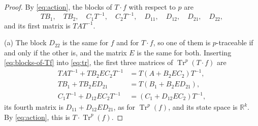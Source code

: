 \documentclass[11pt,a4paper]{article}
\theoremstyle{plain}
\theoremstyle{definition}
\theoremstyle{remark}
\DeclareMathOperator{\Tr}{Tr}
\newcommand{\R}{\mathbb{R}}
\begin{document}
\begin{proof}
    By \cref{eq:action}, the blocks of $T \cdot f$ with respect to $p$ are
    \begin{equation}
        \label{eq:blocks-of-Tf}
        T B_1, \quad T B_2, \quad C_1 T^{-1}, \quad C_2 T^{-1}, \quad D_{11}, \quad D_{12}, \quad D_{21}, \quad D_{22},
    \end{equation}
    and its first matrix is $T A T^{-1}$.

    (a) The block $D_{22}$ is the same for $f$ and for $T \cdot f$, so one of them is $p$-traceable if and only if the other is, and the matrix $E$ is the same for both.
    Inserting \cref{eq:blocks-of-Tf} into \cref{eq:tr}, the first three matrices of $\Tr^p(T \cdot f)$ are
    \begin{align*}
        T A T^{-1} + T B_2 E C_2 T^{-1}  & = T (A + B_2 E C_2) T^{-1}, \\
        T B_1 + T B_2 E D_{21}           & = T (B_1 + B_2 E D_{21}), \\
        C_1 T^{-1} + D_{12} E C_2 T^{-1} & = (C_1 + D_{12} E C_2) T^{-1},
    \end{align*}
    its fourth matrix is $D_{11} + D_{12} E D_{21}$, as for $\Tr^p(f)$, and its state space is $\R^k$.
    By \cref{eq:action}, this is $T \cdot \Tr^p(f)$.


\end{proof}
\end{document}
